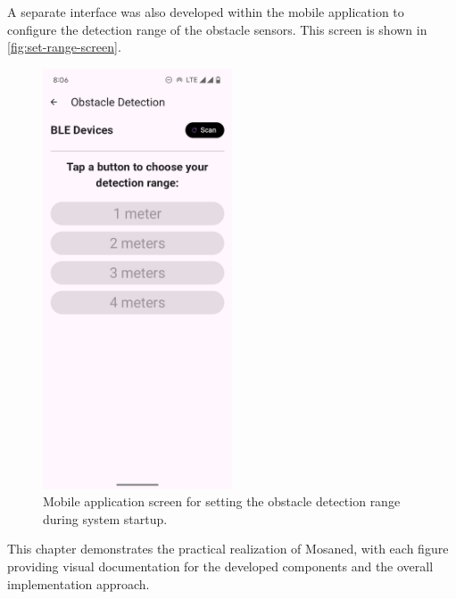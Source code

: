 A separate interface was also developed within the mobile application to configure the detection range of the obstacle sensors. This screen is shown in \autoref{fig:set-range-screen}.

\begin{figure}[h]
	\centering
	\includegraphics[width=0.5\textwidth]{assets/ch5_imp/set_range_screen}
	\caption{Mobile application screen for setting the obstacle detection range during system startup.}
	\label{fig:set-range-screen}
\end{figure}


\bigskip

This chapter demonstrates the practical realization of Mosaned, with each figure providing visual documentation for the developed components and the overall implementation approach.
